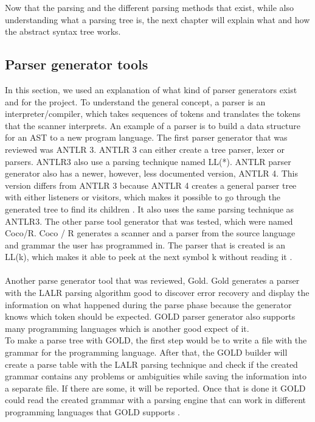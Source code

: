 Now that the parsing and the different parsing methods that exist, while also understanding what a parsing tree is, the next chapter will explain what and how the abstract syntax tree works.

\subsection{Parser generator tools}
In this section, we used an explanation of what kind of parser generators exist and for the project. To understand the general concept, a parser is an interpreter/compiler, which takes sequences of tokens and translates the tokens that the scanner interprets. An example of a parser is to build a data structure for an AST to a new program language.
The first parser generator that was reviewed was ANTLR 3. ANTLR 3 can either create a tree parser, lexer or parsers. ANTLR3 also use a parsing technique named LL(*). ANTLR parser generator also has a newer, however, less documented version, ANTLR 4. This version differs from ANTLR 3 because ANTLR 4 creates a general parser tree with either listeners or visitors, which makes it possible to go through the generated tree to find its children \cite{ANTLR4-Why}. It also uses the same parsing technique as ANTLR3. The other parse tool generator that was tested, which were named Coco/R. Coco / R generates a scanner and a parser from the source language and grammar the user has programmed in. The parser that is created is an LL(k), which makes it able to peek at the next symbol k without reading it \cite{COCO/R}. \\
\\
Another parse generator tool that was reviewed, Gold. Gold generates a parser with the LALR parsing algorithm good to discover error recovery and display the information on what happened during the parse phase because the generator knows which token should be expected. GOLD parser generator also supports many programming languages which is another good expect of it.\\
To make a parse tree with GOLD, the first step would be to write a file with the grammar for the programming language. After that, the GOLD builder will create a parse table with the LALR parsing technique and check if the created grammar contains any problems or ambiguities while saving the information into a separate file. If there are some, it will be reported. Once that is done it GOLD could read the created grammar with a parsing engine that can work in different programming languages that GOLD supports \cite{GOLD}. 
\\

